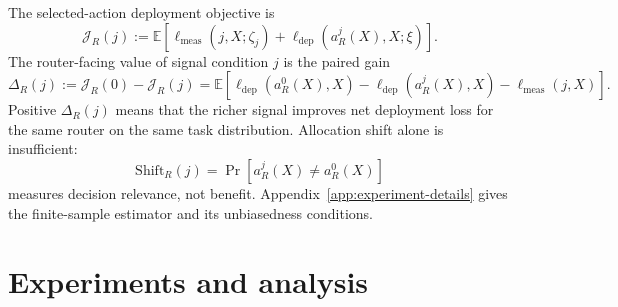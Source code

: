 \documentclass{article}
\newcommand{\E}{\mathbb{E}}
\newcommand{\J}{\mathcal{J}}
\begin{document}
The selected-action deployment objective is
\begin{equation}
\J_R(j)
:=
\E\left[
\ell_{\mathrm{meas}}(j,X;\zeta_j)
+\ell_{\mathrm{dep}}(a_R^j(X),X;\xi)
\right].
\label{eq:router-objective}
\end{equation}
The router-facing value of signal condition $j$ is the paired gain
\begin{equation}
\Delta_R(j)
:=
\J_R(0)-\J_R(j)
=
\E\!\left[
\ell_{\mathrm{dep}}(a_R^0(X),X)
-
\ell_{\mathrm{dep}}(a_R^j(X),X)
-
\ell_{\mathrm{meas}}(j,X)
\right].
\label{eq:router-gain}
\end{equation}
Positive $\Delta_R(j)$ means that the richer signal improves net deployment loss for the same router on the same task distribution.
Allocation shift alone is insufficient:
\[
\mathrm{Shift}_R(j)=\Pr[a_R^j(X)\neq a_R^0(X)]
\]
measures decision relevance, not benefit.
Appendix~\ref{app:experiment-details} gives the finite-sample estimator and its unbiasedness conditions.


\section{Experiments and analysis}
\label{sec:experiments}
\end{document}

